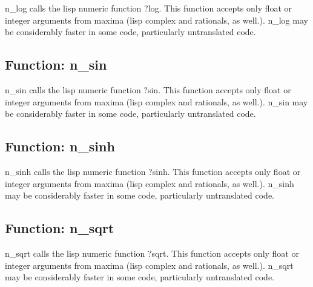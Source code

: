 \documentclass[]{article}
\begin{document}
\vspace{5 pt}
n\_log calls the lisp numeric function ?log. This function accepts only float or integer arguments from maxima (lisp complex and rationals, as well.). n\_log may be considerably faster in some code, particularly untranslated code. 

\vspace{5 pt}


\subsection{Function: n\_sin\label{sec:n_sin}}
\hypertarget{n_sin}{}



\vspace{5 pt}
n\_sin calls the lisp numeric function ?sin. This function accepts only float or integer arguments from maxima (lisp complex and rationals, as well.). n\_sin may be considerably faster in some code, particularly untranslated code. 

\vspace{5 pt}


\subsection{Function: n\_sinh\label{sec:n_sinh}}
\hypertarget{n_sinh}{}



\vspace{5 pt}
n\_sinh calls the lisp numeric function ?sinh. This function accepts only float or integer arguments from maxima (lisp complex and rationals, as well.). n\_sinh may be considerably faster in some code, particularly untranslated code. 

\vspace{5 pt}


\subsection{Function: n\_sqrt\label{sec:n_sqrt}}
\hypertarget{n_sqrt}{}



\vspace{5 pt}
n\_sqrt calls the lisp numeric function ?sqrt. This function accepts only float or integer arguments from maxima (lisp complex and rationals, as well.). n\_sqrt may be considerably faster in some code, particularly untranslated code. 
\end{document}
